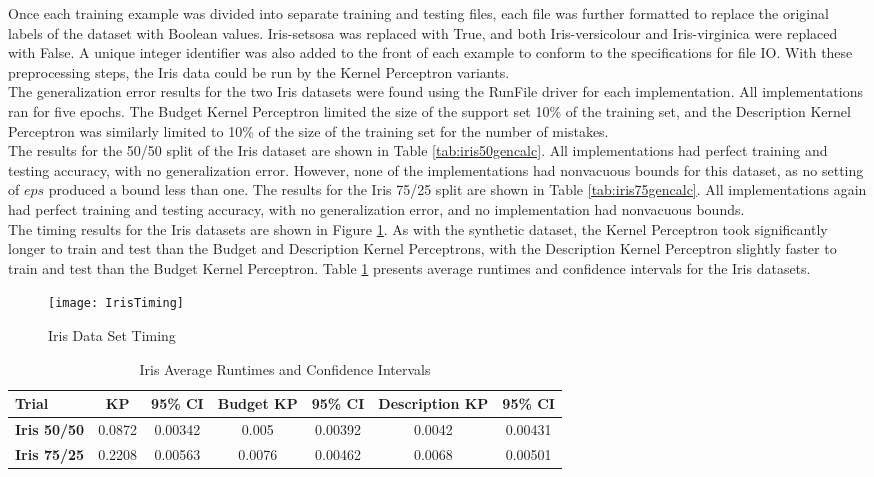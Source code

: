 Once each training example was divided into separate training and testing files, each file was further formatted to replace the original labels of the dataset with Boolean values. Iris-setsosa was replaced with True, and both Iris-versicolour and Iris-virginica were replaced with False. A unique integer identifier was also added to the front of each example to conform to the specifications for file IO. With these preprocessing steps, the Iris data could be run by the Kernel Perceptron variants.
\\The generalization error results for the two Iris datasets were found using the RunFile driver for each implementation. All implementations ran for five epochs. The Budget Kernel Perceptron limited the size of the support set 10\% of the training set, and the Description Kernel Perceptron was similarly limited to 10\% of the size of the training set for the number of mistakes. 
\\The results for the 50/50 split of the Iris dataset are shown in Table \ref{tab:iris50gencalc}. All implementations had perfect training and testing accuracy, with no generalization error. However, none of the implementations had nonvacuous bounds for this dataset, as no setting of $eps$ produced a bound less than one. The results for the Iris 75/25 split are shown in Table \ref{tab:iris75gencalc}. All implementations again had perfect training and testing accuracy, with no generalization error, and no implementation had nonvacuous bounds.
\\The timing results for the Iris datasets are shown in Figure \ref{IrisTiming}. As with the synthetic dataset, the Kernel Perceptron took significantly longer to train and test than the Budget and Description Kernel Perceptrons, with the Description Kernel Perceptron slightly faster to train and test than the Budget Kernel Perceptron. Table \ref{tab:iristabtiming} presents average runtimes and confidence intervals for the Iris datasets.

\begin{figure}[h]
 \caption{Iris Data Set Timing}
 \label{IrisTiming}
 \begin{center}
  \texttt{[image: IrisTiming]}
 \end{center}
\end{figure}

\begin{table}[h]
 \begin{center}
  \caption{Iris Average Runtimes and Confidence Intervals}
  \label{tab:iristabtiming}
  \begin{tabular}{l|c|c|c|c|c|c}
  \textbf{Trial} & \textbf{KP} & \textbf{95\% CI} & \textbf{Budget KP} & \textbf{95\% CI} & \textbf{Description KP} & \textbf{95\% CI}\\
  \hline
  \textbf{Iris 50/50} & 0.0872 & 0.00342 & 0.005 & 0.00392 & 0.0042 & 0.00431\\
  \textbf{Iris 75/25} & 0.2208 & 0.00563 & 0.0076 & 0.00462 & 0.0068 & 0.00501\\
  \end{tabular}
 \end{center}
\end{table}

